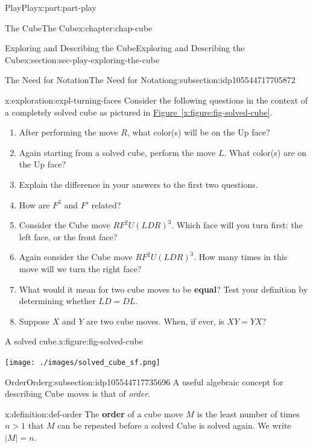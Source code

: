 \documentclass[oneside,10pt,]{book}
\newcommand{\xreffont}{\relax}
\newcommand{\terminology}[1]{\textbf{#1}}
\numberwithin{equation}{section}
\newcommand{\gt}{>}
\begin{document}
\begin{partptx}{Play}{}{Play}{}{}{x:part:part-play}
\begin{chapterptx}{The Cube}{}{The Cube}{}{}{x:chapter:chap-cube}
\begin{sectionptx}{Exploring and Describing the Cube}{}{Exploring and Describing the Cube}{}{}{x:section:sec-play-exploring-the-cube}
\begin{subsectionptx}{The Need for Notation}{}{The Need for Notation}{}{}{g:subsection:idp105544717705872}
\begin{exploration}{}{x:exploration:expl-turning-faces}%
Consider the following questions in the context of a completely solved cube as pictured in \hyperref[x:figure:fig-solved-cube]{Figure~{\xreffont\ref{x:figure:fig-solved-cube}}}.%
%
\begin{enumerate}
\item{}After performing the move \(R\), what color(s) will be on the Up face?%
\item{}Again starting from a solved cube, perform the move \(L\). What color(s) are on the Up face?%
\item{}Explain the difference in your answers to the first two questions.%
\item{}How are \(F^3\) and \(F'\) related?%
\item{}Consider the Cube move \(RF^2 U (LDR)^3\). Which face will you turn first: the left face, or the front face?%
\item{}Again consider the Cube move \(RF^2 U (LDR)^3\). How many times in this move will we turn the right face?%
\item{}What would it mean for two cube moves to be \terminology{equal}? Test your definition by determining whether \(LD = DL\).%
\item{}Suppose \(X\) and \(Y\) are two cube moves. When, if ever, is \(XY = YX\)?%
\end{enumerate}
\begin{figureptx}{A solved cube.}{x:figure:fig-solved-cube}{}%
\begin{image}{0.25}{0.5}{0.25}%
\texttt{[image: ./images/solved\_cube\_sf.png]}
\end{image}%
\tcblower
\end{figureptx}%
\end{exploration}%
\end{subsectionptx}
%
%
\typeout{************************************************}
\typeout{************************************************}
%
\begin{subsectionptx}{Order}{}{Order}{}{}{g:subsection:idp105544717735696}
A useful algebraic concept for describing Cube moves is that of \emph{order}.%
\begin{definition}{}{x:definition:def-order}%
%
The \terminology{order} of a cube move \(M\) is the least number of times \(n \gt 1\) that \(M\) can be repeated before a solved Cube is solved again. We write \(|M| = n\).%
\end{definition}

\end{subsectionptx}
\end{sectionptx}
\end{chapterptx}
\end{partptx}
\end{document}
